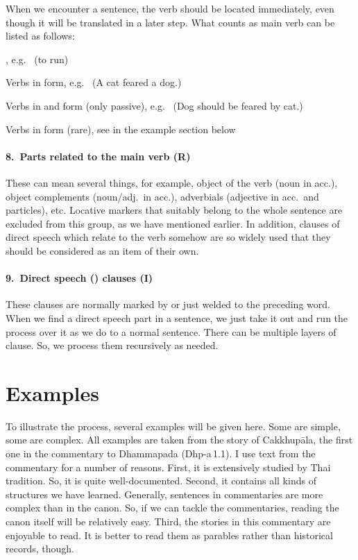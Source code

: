 When we encounter a sentence, the verb should be located immediately, even though it will be translated in a later step. What counts as main verb can be listed as follows:
\begin{compactenum}[(1)]
\item {}, e.g.\  (to run)\par
\item Verbs in  form, e.g.\  (A cat feared a dog.)\par
\item Verbs in  and  form (only passive), e.g.\  (Dog should be feared by cat.)\par
\item Verbs in  form (rare), see  in the example section below\par
\end{compactenum}

\paragraph*{8.\ Parts related to the main verb (\textbf{R})} These can mean several things, for example, object of the verb (noun in acc.), object complements (noun/adj.\ in acc.), adverbials (adjective in acc.\ and particles), etc. Locative markers that suitably belong to the whole sentence are excluded from this group, as we have mentioned earlier. In addition, clauses of direct speech which relate to the verb somehow are so widely used that they should be considered as an item of their own.

\paragraph*{9.\ Direct speech () clauses (\textbf{I})} These clauses are normally marked by  or just  welded to the preceding word. When we find a direct speech part in a sentence, we just take it out and run the process over it as we do to a normal sentence. There can be multiple layers of  clause. So, we process them recursively as needed.

\section*{Examples}

To illustrate the process, several examples will be given here. Some are simple, some are complex. All examples are taken from the story of Cakkhup\=ala, the first one in the commentary to Dhammapada (Dhp-a\,1.1). I use text from the commentary for a number of reasons. First, it is extensively studied by Thai tradition. So, it is quite well-documented. Second, it contains all kinds of structures we have learned. Generally, sentences in commentaries are more complex than in the canon. So, if we can tackle the commentaries, reading the canon itself will be relatively easy. Third, the stories in this commentary are enjoyable to read. It is better to read them as parables rather than historical records, though.


